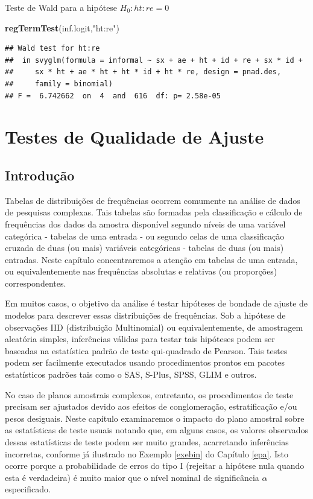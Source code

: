 \documentclass[]{book}
\newenvironment{Shaded}{\begin{snugshade}}{\end{snugshade}}
\newcommand{\KeywordTok}[1]{\textcolor[rgb]{0.13,0.29,0.53}{\textbf{{#1}}}}
\newcommand{\StringTok}[1]{\textcolor[rgb]{0.31,0.60,0.02}{{#1}}}
\newcommand{\NormalTok}[1]{{#1}}
\numberwithin{example}{chapter}
\numberwithin{remark}{chapter}
\numberwithin{definition}{chapter}
\begin{document}
Teste de Wald para a hipótese \(H_0: ht:re=0\)

\begin{Shaded}
\begin{Highlighting}[]
\KeywordTok{regTermTest}\NormalTok{(inf.logit,}\StringTok{"ht:re"}\NormalTok{)}
\end{Highlighting}
\end{Shaded}

\begin{verbatim}
## Wald test for ht:re
##  in svyglm(formula = informal ~ sx + ae + ht + id + re + sx * id + 
##     sx * ht + ae * ht + ht * id + ht * re, design = pnad.des, 
##     family = binomial)
## F =  6.742662  on  4  and  616  df: p= 2.58e-05
\end{verbatim}

\chapter{Testes de Qualidade de Ajuste}\label{testqualajust}

\section{Introdução}\label{introducao-1}

Tabelas de distribuições de frequências ocorrem comumente na análise de
dados de pesquisas complexas. Tais tabelas são formadas pela
classificação e cálculo de frequências dos dados da amostra disponível
segundo níveis de uma variável categórica - tabelas de uma entrada - ou
segundo celas de uma classificação cruzada de duas (ou mais) variáveis
categóricas - tabelas de duas (ou mais) entradas. Neste capítulo
concentraremos a atenção em tabelas de uma entrada, ou equivalentemente
nas frequências absolutas e relativas (ou proporções) correspondentes.

Em muitos casos, o objetivo da análise é testar hipóteses de bondade de
ajuste de modelos para descrever essas distribuições de frequências. Sob
a hipótese de observações IID (distribuição Multinomial) ou
equivalentemente, de amostragem aleatória simples, inferências válidas
para testar tais hipóteses podem ser baseadas na estatística padrão de
teste qui-quadrado de Pearson. Tais testes podem ser facilmente
executados usando procedimentos prontos em pacotes estatísticos padrões
tais como o SAS, S-Plus, SPSS, GLIM e outros.

No caso de planos amostrais complexos, entretanto, os procedimentos de
teste precisam ser ajustados devido aos efeitos de conglomeração,
estratificação e/ou pesos desiguais. Neste capítulo examinaremos o
impacto do plano amostral sobre as estatísticas de teste usuais notando
que, em alguns casos, os valores observados dessas estatísticas de teste
podem ser muito grandes, acarretando inferências incorretas, conforme já
ilustrado no Exemplo \ref{exebin} do Capítulo \ref{epa}. Isto ocorre
porque a probabilidade de erros do tipo I (rejeitar a hipótese nula
quando esta é verdadeira) é muito maior que o nível nominal de
significância \(\alpha\) especificado.
\end{document}
